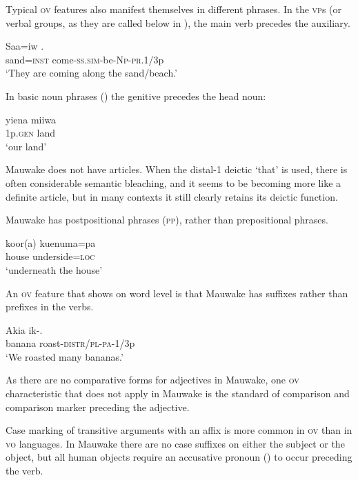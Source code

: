 Typical \textsc{ov} features also manifest themselves in different phrases. In the \textsc{vp}s (or verbal groups, as they are called below in ), the main verb precedes the auxiliary.

\ea%
\label{ex:1:x679}
\gll Saa=iw . \\
 sand=\textsc{inst} come-\textsc{ss}.\textsc{sim}-be-\textsc{Np}-\textsc{pr}.1/3p \\
\glt`They are coming along the sand/beach.'
\z


In basic noun phrases () the genitive precedes the head noun:

\ea%
\label{ex:1:x680}
\gll yiena miiwa \\
 1p.\textsc{gen} land \\
\glt`our land'
\z


Mauwake does not have articles. When the distal-1 deictic  `that' is used, there is often considerable semantic bleaching, and it seems to be becoming more like a definite article, but in many contexts it still clearly retains its deictic function.

Mauwake has postpositional phrases (\textsc{pp}), rather than prepositional phrases.

\ea%
\label{ex:1:x681}
\gll koor(a) kuenuma=pa \\
 house underside=\textsc{loc} \\
\glt`underneath the house'
\z



An \textsc{ov} feature that shows on word level is that Mauwake has suffixes rather than prefixes in the verbs.

\ea%
\label{ex:1:x682}
\gll Akia  ik-. \\
 banana  roast-\textsc{distr}/\textsc{pl}-\textsc{pa}-1/3p     \\
\glt`We roasted many bananas.'
\z


As there are no comparative forms for adjectives in Mauwake, one \textsc{ov} characteristic that does not apply in Mauwake is the standard of comparison and comparison marker preceding the adjective. 

Case marking of transitive arguments with an affix is more common in \textsc{ov} than in \textsc{vo} languages.  In Mauwake there are no case suffixes on either the subject or the object, but all human objects require an accusative pronoun () to occur preceding the verb.

